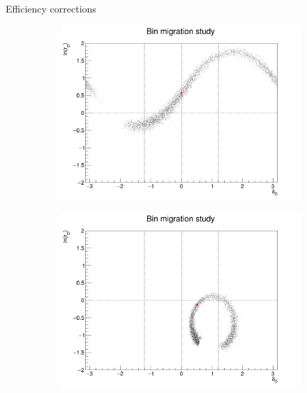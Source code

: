 \documentclass{beamer}
\begin{document}
\begin{frame}{Efficiency corrections}
\begin{figure}
\begin{subfigure}{0.38\textwidth}
      \includegraphics[width=\textwidth]{Plots/BinMigration_Point14.png}
    \end{subfigure}%
    \begin{subfigure}{0.38\textwidth}
      \centering
      \includegraphics[width=\textwidth]{Plots/BinMigration_Point17.png}
    \end{subfigure}
  \end{figure}
\end{frame}
\end{document}
